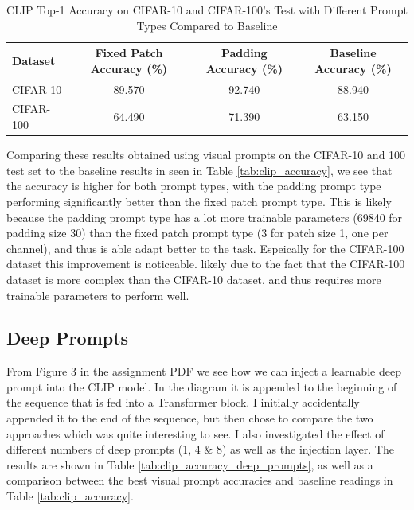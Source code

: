 \documentclass[a4paper]{article}
\begin{document}
\begin{table}[h]
    \centering
    \begin{tabular}{|l|c|c||c|}
    \hline
    \rowcolor{Gray}
    \textbf{Dataset} & \textbf{Fixed Patch Accuracy (\%)} & \textbf{Padding Accuracy (\%)} & \textbf{Baseline Accuracy (\%)} \\ \hline
    CIFAR-10 & 89.570 & 92.740 & 88.940 \\ \hline
    CIFAR-100 & 64.490 & 71.390 & 63.150 \\ \hline
    \end{tabular}
    \caption{CLIP Top-1 Accuracy on CIFAR-10 and CIFAR-100's Test with Different Prompt Types Compared to Baseline}
    \label{tab:clip_accuracy_prompt_types}
\end{table}

Comparing these results obtained using visual prompts on the CIFAR-10 and 100 test set to the baseline results in
seen in Table \ref{tab:clip_accuracy}, we see that the accuracy is higher for both prompt types, with the padding
prompt type performing significantly better than the fixed patch prompt type. This is likely because the padding
prompt type has a lot more trainable parameters (69840 for padding size 30) than the fixed patch prompt type (3 for
patch size 1, one per channel), and thus is able adapt better to the task. Espeically for the CIFAR-100 dataset this
improvement is noticeable. likely due to the fact that the CIFAR-100 dataset is more complex than the CIFAR-10
dataset, and thus requires more trainable parameters to perform well.
\bigskip

\subsection{Deep Prompts}
From Figure 3 in the assignment PDF we see how we can inject a learnable deep prompt into the CLIP model. In the
diagram it is appended to the beginning of the sequence that is fed into a Transformer block. I initially accidentally
appended it to the end of the sequence, but then chose to compare the two approaches which was quite interesting to
see. I also investigated the effect of different numbers of deep prompts (1, 4 \& 8) as well as the injection layer.
The results are shown in Table \ref{tab:clip_accuracy_deep_prompts}, as well as a comparison between the best visual
prompt accuracies and baseline readings in Table \ref{tab:clip_accuracy}.
\end{document}
